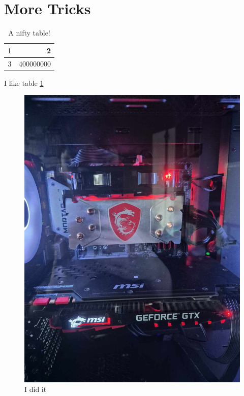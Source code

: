\documentclass{report}
\begin{document}
\newpage

\section{More Tricks}

\begin{table}
    \caption{A nifty table!}
    \label{niftyTable}
    \begin{center}
        \begin{tabular}{|c|r|}
            \hline
            1 & 2         \\
            \hline
            3 & 400000000 \\
            \hline
        \end{tabular}
    \end{center}
\end{table}

I like table \ref{niftyTable}

\begin{figure}
    \centering
    \includegraphics[width=\textwidth]{cooler.jpg}
    \caption{I did it}
    \label{cooler}
\end{figure}
\end{document}
